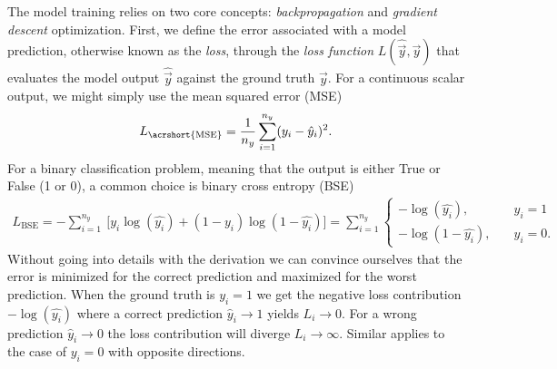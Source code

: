 The model training relies on two core concepts: \textit{backpropagation} and \textit{gradient descent} optimization. First, we define the error associated with a model prediction, otherwise known as the \textit{loss}, through the \textit{loss function} $L(\hat{\vec{y}}, \vec{y})$ that evaluates the model output $\hat{\vec{y}}$ against the ground truth $\vec{y}$. For a continuous scalar output, we might simply use the mean squared error (\acrshort{MSE})
\begin{align}
  L_{\text{\acrshort{MSE}}} = \frac{1}{n_y} \sum_{i = 1}^{n_y} (y_i - \hat{y}_i)^2.
  \label{eq:MSE}
\end{align}
For a binary classification problem, meaning that the output is either True or False (1 or 0), a common choice is binary cross entropy (BSE)
\begin{align}
  L_{\text{BSE}} =  -\sum_{i=1}^{n_y} \ \Big[y_i\log(\hat{y_i}) + (1-y_i)\log(1 - \hat{y_i}) \Big] =  \sum_{i=1}^{n_y}   \begin{cases}
    - \log{(\hat{y_i})},& \quad y_i = 1 \\
    -\log{(1-\hat{y_i})},& \quad y_i = 0.
  \label{eq:BSE}
\end{cases}
\end{align}
Without going into details with the derivation we can convince ourselves that the error is minimized for the correct prediction and maximized for the worst prediction. When the ground truth is $y_i = 1$ we get the negative loss contribution $-\log(\hat{y_i})$ where a correct prediction $\hat{y}_i \to 1$ yields $L_i \to 0$. For a wrong prediction $\hat{y}_i \to 0$ the loss contribution will diverge $L_i \to \infty$. Similar applies to the case of $y_i = 0$ with opposite directions. 

